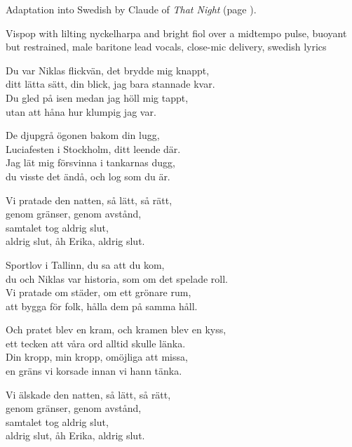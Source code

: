 
\begin{notes}
Adaptation into Swedish by Claude of \emph{That Night} (page \pageref{sec:that-night}).
\end{notes}
\begin{style}
Vispop with lilting nyckelharpa and bright fiol over a midtempo pulse, buoyant but restrained, male baritone lead vocals, close-mic delivery, swedish lyrics
\end{style}
\begin{lyrics}

Du var Niklas flickvän, det brydde mig knappt,\\
ditt lätta sätt, din blick, jag bara stannade kvar.\\
Du gled på isen medan jag höll mig tappt,\\
utan att håna hur klumpig jag var.

De djupgrå ögonen bakom din lugg,\\
Luciafesten i Stockholm, ditt leende där.\\
Jag lät mig försvinna i tankarnas dugg,\\
du visste det ändå, och log som du är.

Vi pratade den natten, så lätt, så rätt,\\
genom gränser, genom avstånd,\\
samtalet tog aldrig slut,\\
aldrig slut, åh Erika, aldrig slut.

Sportlov i Tallinn, du sa att du kom,\\
du och Niklas var historia, som om det spelade roll.\\
Vi pratade om städer, om ett grönare rum,\\
att bygga för folk, hålla dem på samma håll.

Och pratet blev en kram, och kramen blev en kyss,\\
ett tecken att våra ord alltid skulle länka.\\
Din kropp, min kropp, omöjliga att missa,\\
en gräns vi korsade innan vi hann tänka.

Vi älskade den natten, så lätt, så rätt,\\
genom gränser, genom avstånd,\\
samtalet tog aldrig slut,\\
aldrig slut, åh Erika, aldrig slut.


\end{lyrics}
